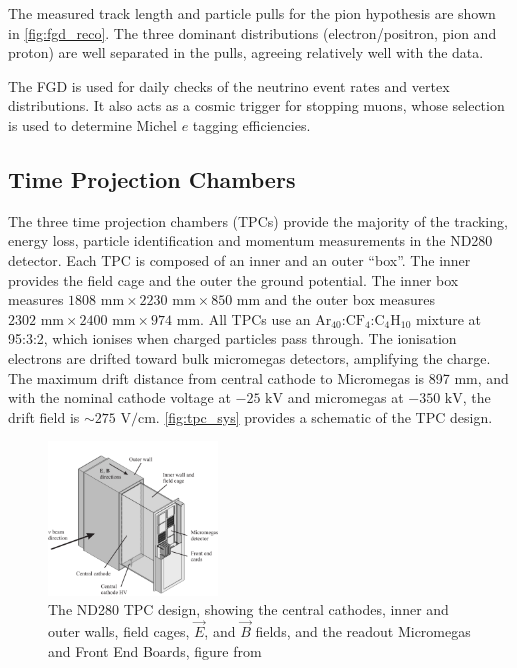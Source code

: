 The measured track length and particle pulls for the pion hypothesis are shown in \autoref{fig:fgd_reco}. The three dominant distributions (electron/positron, pion and proton) are well separated in the pulls, agreeing relatively well with the data.

The FGD is used for daily checks of the neutrino event rates and vertex distributions. It also acts as a cosmic trigger for stopping muons, whose selection is used to determine Michel $e$ tagging efficiencies.

\subsection{Time Projection Chambers}
The three time projection chambers (TPCs)\cite{t2k_tpc} provide the majority of the tracking, energy loss, particle identification and momentum measurements in the ND280 detector. Each TPC is composed of an inner and an outer ``box''. The inner provides the field cage and the outer the ground potential. The inner box measures $1808\text{ mm}\times2230\text{ mm}\times850\text{ mm}$ and the outer box measures $2302\text{ mm}\times2400\text{ mm}\times974\text{ mm}$.  All TPCs use an $\text{Ar}_{40}$:$\text{CF}_4$:$\text{C}_4\text{H}_{10}$ mixture at 95:3:2, which ionises when charged particles pass through. The ionisation electrons are drifted toward bulk micromegas detectors\cite{micromegas_1, micromegas_2}, amplifying the charge. The maximum drift distance from central cathode to Micromegas is 897 mm, and with the nominal cathode voltage at $-25\text{ kV}$ and micromegas at $-350\text{ kV}$, the drift field is $\sim 275\text{ V/cm}$. \autoref{fig:tpc_sys} provides a schematic of the TPC design.
\begin{figure}[h]
	\includegraphics[width=0.4\textwidth, trim={0mm 0mm 0mm 0mm}, clip,page=1]{figures/det_chap/tpc/tpc_1}
	\caption{The ND280 TPC design, showing the central cathodes, inner and outer walls, field cages, $\vec{E}$, and $\vec{B}$ fields, and the readout Micromegas and Front End Boards, figure from \cite{t2k_tpc}}
	\label{fig:tpc_sys}
\end{figure}

